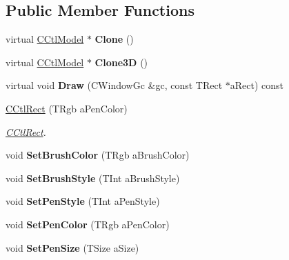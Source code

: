 \subsection*{Public Member Functions}
\begin{DoxyCompactItemize}
\item 
\mbox{\label{classCCtlRect_af2e9d6637c617c2e6f433645ca7767ac}} 
virtual \hyperlink{classCCtlModel}{C\+Ctl\+Model} $\ast$ {\bfseries Clone} ()
\item 
\mbox{\label{classCCtlRect_af0e3e97cfcc25a913e940821267dea56}} 
virtual \hyperlink{classCCtlModel}{C\+Ctl\+Model} $\ast$ {\bfseries Clone3D} ()
\item 
\mbox{\label{classCCtlRect_a75ff051c619c7e4e967548934c85fad1}} 
virtual void {\bfseries Draw} (C\+Window\+Gc \&gc, const T\+Rect $\ast$a\+Rect) const
\item 
\mbox{\label{classCCtlRect_a70b13e08edc267da43dfbc1f29856db9}} 
\hyperlink{classCCtlRect_a70b13e08edc267da43dfbc1f29856db9}{C\+Ctl\+Rect} (T\+Rgb a\+Pen\+Color)
\begin{DoxyCompactList}\small\item\em \hyperlink{classCCtlRect}{C\+Ctl\+Rect}. \end{DoxyCompactList}\item 
\mbox{\label{classCCtlRect_ad666d07312d1fc2ec9cd1d28bde26ba5}} 
void {\bfseries Set\+Brush\+Color} (T\+Rgb a\+Brush\+Color)
\item 
\mbox{\label{classCCtlRect_a590ad7db1f3ddf9273f7bc544b1473be}} 
void {\bfseries Set\+Brush\+Style} (T\+Int a\+Brush\+Style)
\item 
\mbox{\label{classCCtlRect_a729abc05fd674a17b9142adffb11b4a1}} 
void {\bfseries Set\+Pen\+Style} (T\+Int a\+Pen\+Style)
\item 
\mbox{\label{classCCtlRect_a76c6edde142573cf406a1ece4cc8b261}} 
void {\bfseries Set\+Pen\+Color} (T\+Rgb a\+Pen\+Color)
\item 
\mbox{\label{classCCtlRect_a904b5b1a71326405abc594803318c5e2}} 
void {\bfseries Set\+Pen\+Size} (T\+Size a\+Size)
\end{DoxyCompactItemize}
